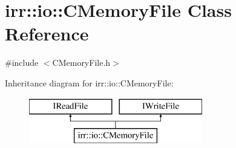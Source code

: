 \hypertarget{classirr_1_1io_1_1_c_memory_file}{\section{irr\-:\-:io\-:\-:C\-Memory\-File Class Reference}
\label{classirr_1_1io_1_1_c_memory_file}
}


{\ttfamily \#include $<$C\-Memory\-File.\-h$>$}

Inheritance diagram for irr\-:\-:io\-:\-:C\-Memory\-File\-:\begin{figure}[H]
\begin{center}
\leavevmode
\includegraphics[height=2.000000cm]{classirr_1_1io_1_1_c_memory_file}
\end{center}
\end{figure}
